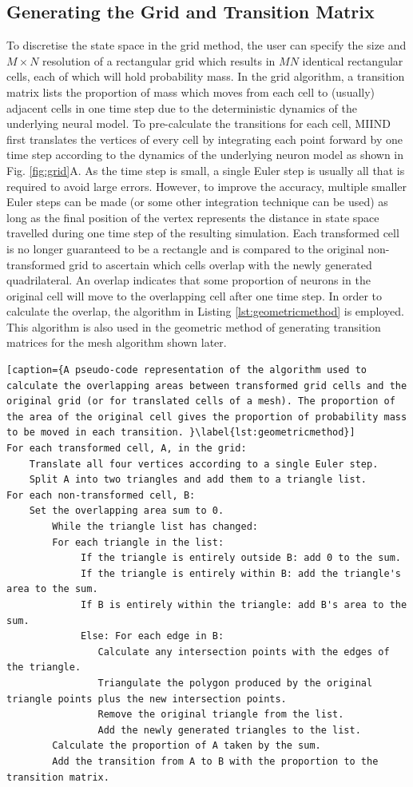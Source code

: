\documentclass[utf8]{frontiersSCNS} %
\begin{document}
\subsection{Generating the Grid and Transition Matrix}
\label{gridgenerate}
To discretise the state space in the grid method, the user can specify the size and $M\times N$ resolution of a rectangular grid which results in $MN$ identical rectangular cells, each of which will hold probability mass. In the grid algorithm, a transition matrix lists the proportion of mass which moves from each cell to (usually) adjacent cells in one time step due to the deterministic dynamics of the underlying neural model. To pre-calculate the transitions for each cell, MIIND first translates the vertices of every cell by integrating each point forward by one time step according to the dynamics of the underlying neuron model as shown in Fig. \ref{fig:grid}A. As the time step is small, a single Euler step is usually all that is required to avoid large errors. However, to improve the accuracy, multiple smaller Euler steps can be made (or some other integration technique can be used) as long as the final position of the vertex represents the distance in state space travelled during one time step of the resulting simulation. Each transformed cell is no longer guaranteed to be a rectangle and is compared to the original non-transformed grid to ascertain which cells overlap with the newly generated quadrilateral. An overlap indicates that some proportion of neurons in the original cell will move to the overlapping cell after one time step. In order to calculate the overlap, the algorithm in Listing \ref{lst:geometricmethod} is employed. This algorithm is also used in the geometric method of generating transition matrices for the mesh algorithm shown later.

\begin{lstlisting}[caption={A pseudo-code representation of the algorithm used to calculate the overlapping areas between transformed grid cells and the original grid (or for translated cells of a mesh). The proportion of the area of the original cell gives the proportion of probability mass to be moved in each transition. }\label{lst:geometricmethod}]
For each transformed cell, A, in the grid:
	Translate all four vertices according to a single Euler step.
	Split A into two triangles and add them to a triangle list.
For each non-transformed cell, B:
	Set the overlapping area sum to 0.
		While the triangle list has changed:
		For each triangle in the list:
			 If the triangle is entirely outside B: add 0 to the sum.
			 If the triangle is entirely within B: add the triangle's area to the sum.
			 If B is entirely within the triangle: add B's area to the sum.
			 Else: For each edge in B:
				Calculate any intersection points with the edges of the triangle.
				Triangulate the polygon produced by the original triangle points plus the new intersection points.
				Remove the original triangle from the list.
				Add the newly generated triangles to the list.
		Calculate the proportion of A taken by the sum.
		Add the transition from A to B with the proportion to the transition matrix.	
\end{lstlisting}
\end{document}
